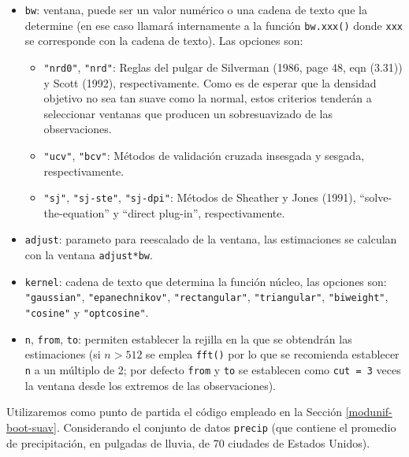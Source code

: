\documentclass[]{book}
\theoremstyle{break}
\theoremstyle{definition}
\theoremstyle{definition}
\theoremstyle{definition}
\theoremstyle{remark}
\begin{document}
\begin{itemize}
\item
  \texttt{bw}: ventana, puede ser un valor numérico o una cadena de
  texto que la determine (en ese caso llamará internamente a la función
  \texttt{bw.xxx()} donde \texttt{xxx} se corresponde con la cadena de
  texto). Las opciones son:

  \begin{itemize}
  \item
    \texttt{"nrd0"}, \texttt{"nrd"}: Reglas del pulgar de Silverman
    (1986, page 48, eqn (3.31)) y Scott (1992), respectivamente. Como es
    de esperar que la densidad objetivo no sea tan suave como la normal,
    estos criterios tenderán a seleccionar ventanas que producen un
    sobresuavizado de las observaciones.
  \item
    \texttt{"ucv"}, \texttt{"bcv"}: Métodos de validación cruzada
    insesgada y sesgada, respectivamente.
  \item
    \texttt{"sj"}, \texttt{"sj-ste"}, \texttt{"sj-dpi"}: Métodos de
    Sheather y Jones (1991), ``solve-the-equation'' y ``direct
    plug-in'', respectivamente.
  \end{itemize}
\item
  \texttt{adjust}: parameto para reescalado de la ventana, las
  estimaciones se calculan con la ventana \texttt{adjust*bw}.
\item
  \texttt{kernel}: cadena de texto que determina la función núcleo, las
  opciones son: \texttt{"gaussian"}, \texttt{"epanechnikov"},
  \texttt{"rectangular"}, \texttt{"triangular"}, \texttt{"biweight"},
  \texttt{"cosine"} y \texttt{"optcosine"}.
\item
  \texttt{n}, \texttt{from}, \texttt{to}: permiten establecer la rejilla
  en la que se obtendrán las estimaciones (si \(n>512\) se emplea
  \texttt{fft()} por lo que se recomienda establecer \texttt{n} a un
  múltiplo de 2; por defecto \texttt{from} y \texttt{to} se establecen
  como \texttt{cut\ =\ 3} veces la ventana desde los extremos de las
  observaciones).
\end{itemize}

Utilizaremos como punto de partida el código empleado en la Sección
\ref{modunif-boot-suav}. Considerando el conjunto de datos
\texttt{precip} (que contiene el promedio de precipitación, en pulgadas
de lluvia, de 70 ciudades de Estados Unidos).
\end{document}
